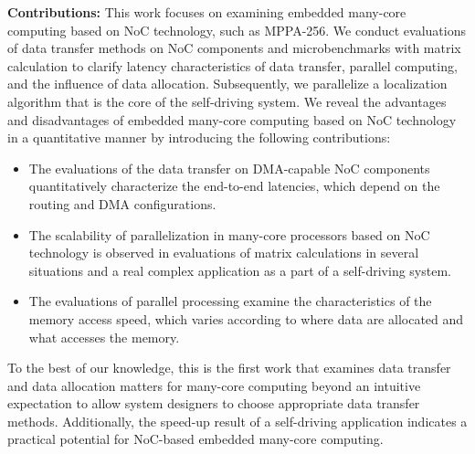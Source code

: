   
  \textbf{Contributions:}
  This work focuses on examining embedded many-core computing based on NoC technology, such as MPPA-256.
  We conduct evaluations of data transfer methods on NoC components and microbenchmarks with matrix calculation to clarify latency characteristics of data transfer, parallel computing, and the influence of data allocation.
  Subsequently, we parallelize a localization algorithm that is the core of the self-driving system.
  We reveal the advantages and disadvantages of embedded many-core computing based on NoC technology in a quantitative manner by introducing the following contributions:
  
  \begin{itemize}
    \setlength{\leftskip}{-5mm}
    \item The evaluations of the data transfer on DMA-capable NoC components quantitatively characterize the end-to-end latencies, which depend on the routing and DMA configurations.
    \item The scalability of parallelization in many-core processors based on NoC technology is observed in evaluations of matrix calculations in several situations and a real complex application as a part of a self-driving system.
    \item The evaluations of parallel processing examine the characteristics of the memory access speed, which varies according to where data are allocated and what accesses the memory.
  \end{itemize}
    
  To the best of our knowledge, this is the first work that examines data transfer and data allocation matters for many-core computing beyond an intuitive expectation to allow system designers to choose appropriate data transfer methods.
  Additionally, the speed-up result of a self-driving application indicates a practical potential for NoC-based embedded many-core computing.
  

